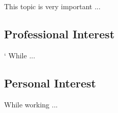 This topic is very important ...

\subsection{Professional Interest}`
While  ...\\

\subsection{Personal Interest}
While working ...\\ 
